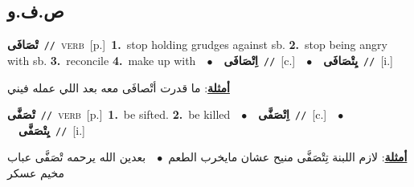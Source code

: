 \documentclass[10pt,a4paper,twoside]{article} %
\begin{document}
\begin{multicols}{2}
\vspace{-3mm}
\subsection*{\color{blue}\foreignlanguage{arabic}{ص.ف.و}\color{blue}{}} 

{\setlength\topsep{0pt}\textbf{\foreignlanguage{arabic}{تْصَافَى}}\ {\color{gray}\texttt{//}\color{black}}\ \textsc{verb}\ [p.]\ \textbf{1.}~stop holding grudges against sb.  \textbf{2.}~stop being angry with sb.  \textbf{3.}~reconcile  \textbf{4.}~make up with\ \ $\bullet$\ \ \setlength\topsep{0pt}\textbf{\foreignlanguage{arabic}{اِتْصَافَى}}\ {\color{gray}\texttt{//}\color{black}}\ [c.]\ \ $\bullet$\ \ \setlength\topsep{0pt}\textbf{\foreignlanguage{arabic}{يِتْصَافَى}}\ {\color{gray}\texttt{//}\color{black}}\ [i.]\  \begin{flushright}\color{gray}\foreignlanguage{arabic}{\textbf{\underline{\foreignlanguage{arabic}{أمثلة}}}: ما قدرت أتْصافَى معه بعد اللي عمله فيني}\end{flushright}\color{black}} \vspace{2mm}

{\setlength\topsep{0pt}\textbf{\foreignlanguage{arabic}{تْصَفَّى}}\ {\color{gray}\texttt{//}\color{black}}\ \textsc{verb}\ [p.]\ \textbf{1.}~be sifted.  \textbf{2.}~be killed\ \ $\bullet$\ \ \setlength\topsep{0pt}\textbf{\foreignlanguage{arabic}{اِتْصَفَّى}}\ {\color{gray}\texttt{//}\color{black}}\ [c.]\ \ $\bullet$\ \ \setlength\topsep{0pt}\textbf{\foreignlanguage{arabic}{يِتْصَفَّى}}\ {\color{gray}\texttt{//}\color{black}}\ [i.]\  \begin{flushright}\color{gray}\foreignlanguage{arabic}{\textbf{\underline{\foreignlanguage{arabic}{أمثلة}}}: لازم اللبنة تِتْصَفَّى منيح عشان مايخرب الطعم\ $\bullet$\ \  بعدين الله يرحمه تْصَفَّى عباب مخيم عسكر}\end{flushright}\color{black}} \vspace{2mm}


\end{multicols}
\end{document}
